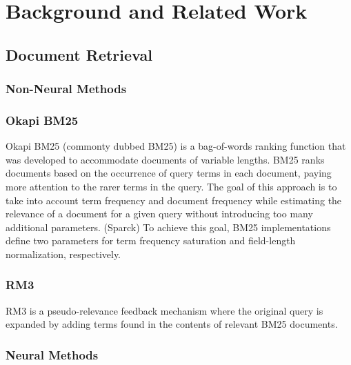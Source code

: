 \chapter{Background and Related Work}

\section{Document Retrieval}

\subsection{Non-Neural Methods}

\subsection{Okapi BM25}


Okapi BM25 (commonty dubbed BM25) is a bag-of-words ranking function that was developed to accommodate documents of variable lengths.
BM25 ranks documents based on the occurrence of query terms in each document, paying more attention to the rarer terms in the query.
The goal of this approach is to take into account term frequency and document frequency while estimating the relevance of a document for a given query without introducing too many additional parameters. (Sparck)
To achieve this goal, BM25 implementations define two parameters for term frequency saturation and field-length normalization, respectively.

\subsection{RM3}

RM3 is a pseudo-relevance feedback mechanism where the original query is expanded by adding terms found in the contents of relevant BM25 documents.


\subsection{Neural Methods}

